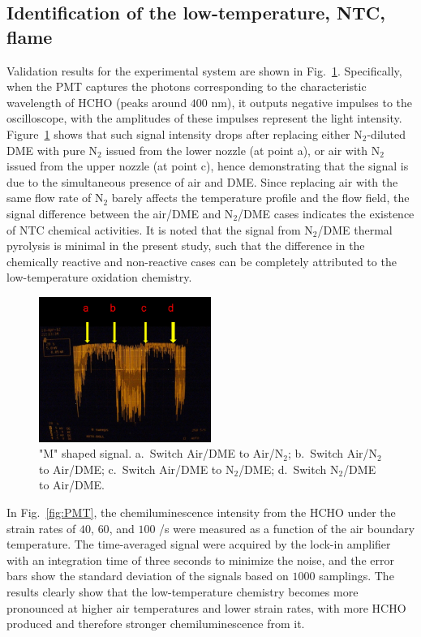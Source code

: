 \documentclass[review,3p,times]{elsarticleUS}
\begin{document}
\subsection{Identification of the low-temperature, NTC, flame} \label{sec:4.1}

Validation results for the experimental system are shown in Fig.~\ref{fig:M}.  Specifically, when the PMT captures the photons corresponding to the characteristic wavelength of HCHO (peaks around $400$ nm), it outputs negative impulses to the oscilloscope, with the amplitudes of these impulses represent the light intensity.  Figure~\ref{fig:M} shows that such signal intensity drops after replacing either N$_2$-diluted DME with pure N$_2$ issued from the lower nozzle (at point a), or air with N$_2$ issued from the upper nozzle (at point c), hence demonstrating that the signal is due to the simultaneous presence of air and DME.  Since replacing air with the same flow rate of N$_2$ barely affects the temperature profile and the flow field, the signal difference between the air/DME and N$_2$/DME cases indicates the existence of NTC chemical activities.  It is noted that the signal from N$_2$/DME thermal pyrolysis is minimal in the present study, such that the difference in the chemically reactive and non-reactive cases can be completely attributed to the low-temperature oxidation chemistry.  


\begin{figure}[t]
  \centering
  \scriptsize
  \vspace{-0.1in}
  \includegraphics[width=0.5\textwidth]{M.png}
  \normalsize
  \caption{"M" shaped signal. a.~Switch Air/DME to Air/N$_2$; b.~Switch Air/N$_2$ to Air/DME; c.~Switch Air/DME to N$_2$/DME; d.~Switch N$_2$/DME to Air/DME.}
  \label{fig:M}
\end{figure}

In Fig.~\ref{fig:PMT}, the chemiluminescence intensity from the HCHO under the strain rates of $40$, $60$, and $100$ /s were measured as a function of the air boundary temperature.  The time-averaged signal were acquired by the lock-in amplifier with an integration time of three seconds to minimize the noise, and the error bars show the standard deviation of the signals based on $1000$ samplings. The results clearly show that the low-temperature chemistry becomes more pronounced at higher air temperatures and lower strain rates, with more HCHO produced and therefore stronger chemiluminescence from it.
\end{document}
